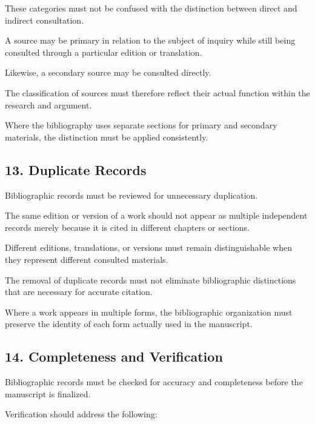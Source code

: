 These categories must
not be confused with
the distinction between
direct and indirect
consultation.

A source may be primary
in relation to the subject
of inquiry while still
being consulted through
a particular edition
or translation.

Likewise, a secondary
source may be consulted
directly.

The classification of
sources must therefore
reflect their actual
function within the
research and argument.

Where the bibliography
uses separate sections
for primary and secondary
materials, the distinction
must be applied consistently.


\subsection*{13. Duplicate Records}

Bibliographic records
must be reviewed for
unnecessary duplication.

The same edition or
version of a work should
not appear as multiple
independent records
merely because it is
cited in different
chapters or sections.

Different editions,
translations, or versions
must remain distinguishable
when they represent
different consulted
materials.

The removal of duplicate
records must not eliminate
bibliographic distinctions
that are necessary for
accurate citation.

Where a work appears
in multiple forms,
the bibliographic organization
must preserve the identity
of each form actually
used in the manuscript.


\subsection*{14. Completeness and Verification}

Bibliographic records
must be checked for
accuracy and completeness
before the manuscript
is finalized.

Verification should
address the following:

